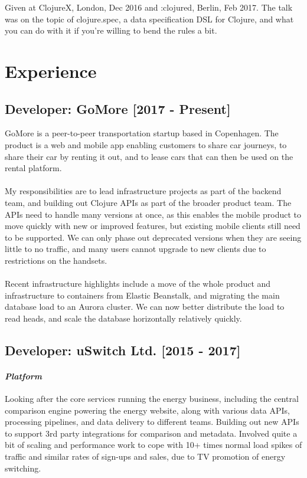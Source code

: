 \documentclass{article}
\begin{document}
Given at ClojureX, London, Dec 2016 and :clojured, Berlin, Feb 2017. The talk
was on the topic of clojure.spec, a data specification DSL for Clojure, and what
you can do with it if you're willing to bend the rules a bit.
\section*{Experience}
\subsection*{Developer: GoMore [2017 - Present]}

GoMore is a peer-to-peer transportation startup based in Copenhagen. The product
is a web and mobile app enabling customers to share car journeys, to share their
car by renting it out, and to lease cars that can then be used on the rental
platform.\\
\\
My responsibilities are to lead infrastructure projects as part of the backend
team, and building out Clojure APIs as part of the broader product team. The
APIs need to handle many versions at once, as this enables the mobile product to
move quickly with new or improved features, but existing mobile clients still
need to be supported. We can only phase out deprecated versions when they are
seeing little to no traffic, and many users cannot upgrade to new clients due to
restrictions on the handsets.\\
\\
Recent infrastructure highlights include a move of the whole product and
infrastructure to containers from Elastic Beanstalk, and migrating the main
database load to an Aurora cluster. We can now better distribute the load to
read heads, and scale the database horizontally relatively quickly.
\subsection*{Developer: uSwitch Ltd. [2015 - 2017]}
\paragraph*{\emph{Platform}}

Looking after the core services running the energy business, including the
central comparison engine powering the energy website, along with various data
APIs, processing pipelines, and data delivery to different teams. Building out
new APIs to support 3rd party integrations for comparison and metadata. Involved
quite a bit of scaling and performance work to cope with 10+ times normal load
spikes of traffic and similar rates of sign-ups and sales, due to TV promotion
of energy switching.
\end{document}
